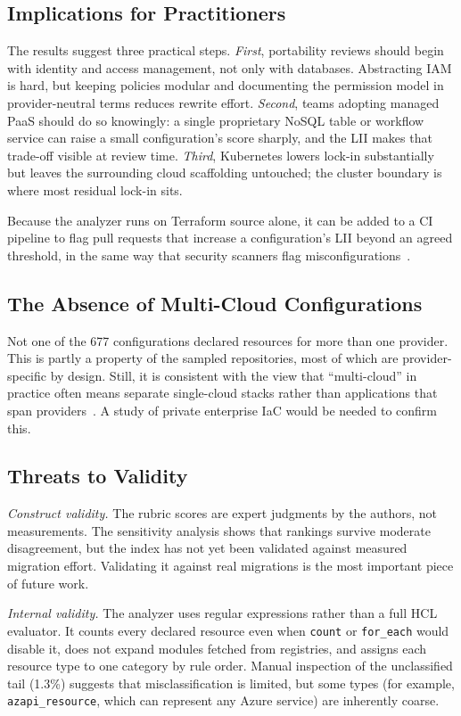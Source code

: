 \documentclass[conference]{IEEEtran}
\begin{document}
\subsection{Implications for Practitioners}
The results suggest three practical steps. \emph{First}, portability reviews should begin with identity and access management, not only with databases. Abstracting IAM is hard, but keeping policies modular and documenting the permission model in provider-neutral terms reduces rewrite effort. \emph{Second}, teams adopting managed PaaS should do so knowingly: a single proprietary NoSQL table or workflow service can raise a small configuration's score sharply, and the LII makes that trade-off visible at review time. \emph{Third}, Kubernetes lowers lock-in substantially but leaves the surrounding cloud scaffolding untouched; the cluster boundary is where most residual lock-in sits.

Because the analyzer runs on Terraform source alone, it can be added to a CI pipeline to flag pull requests that increase a configuration's LII beyond an agreed threshold, in the same way that security scanners flag misconfigurations~\cite{verdet2025}.

\subsection{The Absence of Multi-Cloud Configurations}
Not one of the 677 configurations declared resources for more than one provider. This is partly a property of the sampled repositories, most of which are provider-specific by design. Still, it is consistent with the view that ``multi-cloud'' in practice often means separate single-cloud stacks rather than applications that span providers~\cite{opara2016}. A study of private enterprise IaC would be needed to confirm this.

\subsection{Threats to Validity}
\emph{Construct validity.} The rubric scores are expert judgments by the authors, not measurements. The sensitivity analysis shows that rankings survive moderate disagreement, but the index has not yet been validated against measured migration effort. Validating it against real migrations is the most important piece of future work.

\emph{Internal validity.} The analyzer uses regular expressions rather than a full HCL evaluator. It counts every declared resource even when \texttt{count} or \texttt{for\_each} would disable it, does not expand modules fetched from registries, and assigns each resource type to one category by rule order. Manual inspection of the unclassified tail (1.3\%) suggests that misclassification is limited, but some types (for example, \texttt{azapi\_resource}, which can represent any Azure service) are inherently coarse.
\end{document}
